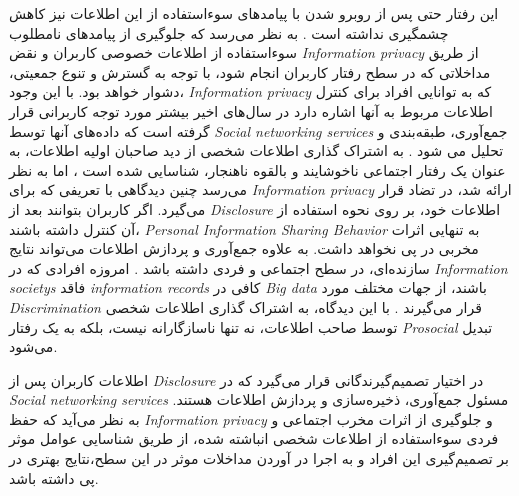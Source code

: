 این رفتار حتی پس از روبرو شدن با
پیامدهای سوءاستفاده از این اطلاعات نیز کاهش چشمگیری نداشته است
\!\citep{hermesWhoQuitsPrivacyInvasive2021,wirthLazinessExplanationPrivacy2022}.
به نظر می‌رسد که جلوگیری از پیامدهای  نامطلوب سوءاستفاده از اطلاعات خصوصی کاربران و نقض
\textit{
  \gls{Information privacy}
}
از طریق مداخلاتی که در سطح رفتار کاربران انجام شود، با توجه به گسترش و تنوع جمعیتی،
دشوار خواهد بود. با این وجود،
\textit{
  \gls{Information privacy}
}
که به توانایی افراد
برای کنترل اطلاعات مربوط به آنها اشاره دارد
\!\citep{smithInformationPrivacyMeasuring1996}
در سال‌های اخیر بیشتر مورد توجه کاربرانی قرار گرفته است
که داده‌های آنها توسط
\textit{
  \glspl{Social networking service}
}
جمع‌آوری، طبقه‌بندی و تحلیل می شود
.
به اشتراک گذاری اطلاعات شخصی از دید صاحبان اولیه اطلاعات،
به عنوان یک رفتار اجتماعی ناخوشایند و بالقوه ناهنجار، شناسایی شده است
\citep{norbergCopingInformationRequests2014}،
اما به نظر می‌رسد چنین دیدگاهی با تعریفی که برای
\textit{
  \gls{Information privacy}
}
ارائه شد، در تضاد قرار می‌گیرد. اگر کاربران بتوانند بعد از
\textit{
  \gls{Disclosure}
}
اطلاعات خود، بر روی نحوه استفاده از آن کنترل داشته باشند،
\textit{
  \gls{Personal Information Sharing Behavior}
}
به تنهایی
اثرات مخربی در پی نخواهد داشت.  به علاوه
جمع‌آوری و پردازش اطلاعات می‌تواند نتایج سازنده‌ای، در سطح اجتماعی و فردی داشته باشد
\citep{rockenbachProvidingPersonalInformation2020}.
امروزه افرادی که در
\textit{
  \glspl{Information society}
}
فاقد
\textit{
  \glspl{information record}
}
کافی در
\textit{
  \gls{Big data}
}
باشند، از جهات مختلف مورد
\textit{
  \gls{Discrimination}
}
قرار می‌گیرند
\!\citep{favarettoBigDataDiscrimination2019,lermanBigDataIts2013}.
با این دیدگاه، به اشتراک گذاری اطلاعات شخصی توسط صاحب اطلاعات، نه تنها
ناسازگارانه نیست، بلکه به یک رفتار
\textit{
  \gls{Prosocial}
}
تبدیل می‌شود.

اطلاعات کاربران پس از
\textit{
  \gls{Disclosure}
}
در اختیار تصمیم‌گیرندگانی قرار می‌گیرد که در
\textit{
  \glspl{Social networking service}
}
مسئول جمع‌آوری، ذخیره‌سازی و پردازش اطلاعات هستند. به نظر می‌آید که حفظ
\textit{
  \gls{Information privacy}
}
و جلوگیری از اثرات مخرب اجتماعی و فردی سوءاستفاده از
اطلاعات شخصی انباشته شده، از طریق شناسایی عوامل موثر
بر تصمیم‌گیری این افراد و به اجرا در آوردن
مداخلات موثر در این سطح،نتایج بهتری در پی داشته باشد.

